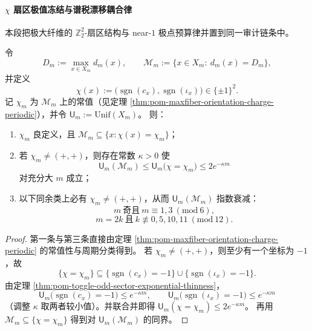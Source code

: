 \paragraph{\texorpdfstring{\(\chi\)}{chi} 扇区极值冻结与谱税漂移耦合律}
本段把极大纤维的 \(\mathbb Z_2^2\)-扇区结构与 near-\(1\) 极点预算律并置到同一审计链条中。

\begin{theorem}[极大纤维的稀有扇区承载律]\label{thm:xi-time-part9h-maxfiber-rare-sector-carrying}
令
\[
D_m:=\max_{x\in X_m}d_m(x),\qquad
\mathcal M_m:=\{x\in X_m:\ d_m(x)=D_m\},
\]
并定义
\[
\chi(x):=\bigl(\operatorname{sgn}(c_x),\operatorname{sgn}(\iota_x)\bigr)\in\{\pm1\}^2.
\]
记 \(\chi_m\) 为 \(\mathcal M_m\) 上的常值（见定理 \ref{thm:pom-maxfiber-orientation-charge-periodic}），并令
\(
\mathsf U_m:=\mathrm{Unif}(X_m)
\)。
则：
\begin{enumerate}
  \item \(\chi_m\) 良定义，且 \(\mathcal M_m\subseteq\{x:\chi(x)=\chi_m\}\)；
  \item 若 \(\chi_m\neq(+,+)\)，则存在常数 \(\kappa>0\) 使
  \[
  \mathsf U_m(\mathcal M_m)
  \le
  \mathsf U_m\!\bigl(\chi=\chi_m\bigr)
  \le
  2e^{-\kappa m}
  \]
  对充分大 \(m\) 成立；
  \item 以下同余类上必有 \(\chi_m\neq(+,+)\)，从而 \(\mathsf U_m(\mathcal M_m)\) 指数衰减：
  \[
  m\ \text{奇且}\ m\equiv 1,3\ (\mathrm{mod}\ 6),
  \]
  \[
  m=2k\ \text{且}\ k\not\equiv 0,5,10,11\ (\mathrm{mod}\ 12).
  \]
\end{enumerate}
\end{theorem}
\begin{proof}
第一条与第三条直接由定理 \ref{thm:pom-maxfiber-orientation-charge-periodic} 的常值性与周期分类得到。
若 \(\chi_m\neq(+,+)\)，则至少有一个坐标为 \(-1\)，故
\[
\{\chi=\chi_m\}
\subseteq
\{\operatorname{sgn}(c_x)=-1\}\cup\{\operatorname{sgn}(\iota_x)=-1\}.
\]
由定理 \ref{thm:pom-toggle-odd-sector-exponential-thinness}，
\[
\mathsf U_m\!\bigl(\operatorname{sgn}(c_x)=-1\bigr)\le e^{-\kappa m},\qquad
\mathsf U_m\!\bigl(\operatorname{sgn}(\iota_x)=-1\bigr)\le e^{-\kappa m}
\]
（调整 \(\kappa\) 取两者较小值）。并联合并即得
\(
\mathsf U_m(\chi=\chi_m)\le 2e^{-\kappa m}
\)。
再用 \(\mathcal M_m\subseteq\{\chi=\chi_m\}\) 得到对 \(\mathsf U_m(\mathcal M_m)\) 的同界。
\end{proof}

